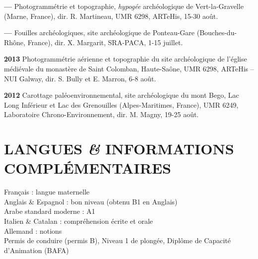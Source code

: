 \documentclass{article}
\newcommand{\fr}[1]{#1}       %
\newcommand{\en}[1]{}     %
\begin{document}
\smallbreak
\textbf{--- }
\fr{Photogrammétrie et topographie, \textit{hypogée} archéologique de Vert-la-Gravelle (Marne, France), dir. R. Martineau, UMR 6298, ARTeHis, 15-30 août.}
\en{Photogrammetry and topography, archaeological \textit{hypogeum} of Vert-la-Gravelle (Marne, France), directed by R. Martineau, UMR 6298, ARTeHis, August 15-30.}

\smallbreak
\textbf{---}
\fr{Fouilles archéologiques, site archéologique de Ponteau-Gare (Bouches-du-Rhône, France), dir. X. Margarit, SRA-PACA, 1-15 juillet.}
\en{Archaeological excavations, archaeological site of Ponteau-Gare (Bouches-du-Rhône, France), directed by X. Margarit, SRA-PACA, July 1-15.}

\smallbreak
\textbf{2013}
\fr{Photogrammétrie aérienne et topographie du site archéologique de l'église médiévale du monastère de Saint Colomban, Haute-Saône, UMR 6298, ARTeHis -- NUI Galway, dir. S. Bully et E. Marron, 6-8 août.}
\en{Aerial photogrammetry and topography of the archaeological site of the medieval church of Saint Colomban Monastery, Haute-Saône, UMR 6298, ARTeHis -- NUI Galway, directed by S. Bully and E. Marron, August 6-8.}

\smallbreak
\textbf{2012}
\fr{Carottage paléoenvironnemental, site archéologique du mont Bego, Lac Long Inférieur et Lac des Grenouilles (Alpes-Maritimes, France), UMR 6249, Laboratoire Chrono-Environnement, dir. M. Magny, 19-25 août.}
\en{Paleoenvironmental coring, archaeological site of Mont Bego, Lower Long Lake and Frog Lake (Alpes-Maritimes, France), UMR 6249, Laboratory of Chrono-Environment, directed by M. Magny, August 19-25.}

\section{\fr{LANGUES \textit{\&} INFORMATIONS COMPLÉMENTAIRES}\en{LANGUAGES \textit{\&} ADDITIONAL INFORMATION}}

\fr{Français : langue maternelle \\
Anglais \& Espagnol : bon niveau (obtenu B1 en Anglais) \\
Arabe standard moderne : A1 \\
Italien \& Catalan : compréhension écrite et orale \\
Allemand : notions \\

Permis de conduire (permis B), Niveau 1 de plongée, Diplôme de Capacité d'Animation (BAFA)}
\en{French: native speaker \\
English \& Spanish: proficient (achieved B1 in English) \\
Modern Standard Arabic: A1 \\
Italian \& Catalan: reading and listening comprehension \\
German: basic knowledge \\

Driver's license (Class B), Level 1 Diving Certificate, Certificate of Aptitude for Youth Leadership and Training (BAFA)}
\end{document}
